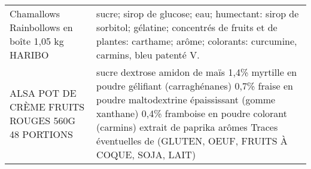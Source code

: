\begin{longtable}{p{5cm}p{10cm}}
                                                           Chamallows Rainbollows en boîte 1,05 kg HARIBO &                                                                                                                                                                                                                                                                                                                                                                                                                                                                                                                                                                                                                                                                                                                                                                                                                                                                sucre; sirop de glucose; eau; humectant: sirop de sorbitol; gélatine; concentrés de fruits et de plantes: carthame; arôme; colorants: curcumine, carmins, bleu patenté V. \\
                                                         ALSA POT DE CRÈME FRUITS ROUGES 560G 48 PORTIONS &                                                                                                                                                                                                                                                                                                                                                                                                                                                                                                                                                                                                                                                                                                                                     sucre  dextrose  amidon de maïs  1,4\% myrtille en poudre  gélifiant (carraghénanes)  0,7\% fraise en poudre  maltodextrine  épaississant (gomme xanthane)  0,4\% framboise en poudre  colorant (carmins)  extrait de paprika  arômes  Traces éventuelles de (GLUTEN, OEUF, FRUITS À COQUE, SOJA, LAIT) \\

\end{longtable}
